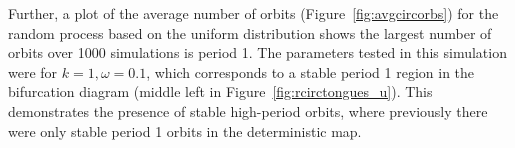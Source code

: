 Further, a plot of the average number of orbits
(Figure~\ref{fig:avgcircorbs}) for the random process based on the
uniform distribution shows the largest number of orbits over 1000
simulations is period 1. The parameters tested in this simulation were
for $k=1, \omega=0.1$, which corresponds to a stable period 1 region
in the bifurcation diagram (middle left in
Figure~\ref{fig:rcirctongues_u}). This demonstrates the presence of
stable high-period orbits, where previously there were only
stable period 1 orbits in the deterministic map.


